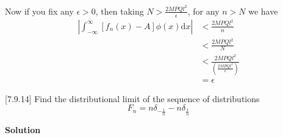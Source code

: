 \documentclass{article}
\begin{document}
%
Now if you fix any $\epsilon > 0$, then taking
$N > \frac{2 M P Q l^2}{\epsilon}$, for any $n > N$ we have
%
\begin{align*}
    \left| \int_{-\infty}^{\infty} \left[ f_n(x) - A \right] \phi(x) \mathrm{d} x \right|
        &< \frac{2 M P Q l^2}{n} \\
        &< \frac{2 M P Q l^2}{N} \\
        &< \frac{2 M P Q l^2}{\left(\frac{2 M P Q l^2}{\epsilon}\right)} \\
        &= \epsilon
\end{align*}

\vspace{5mm}

[7.9.14] Find the distributional limit of the sequence of distributions
%
\begin{equation*}
    F_n = n \delta_{- \frac{1}{n}} - n \delta_{\frac{1}{n}}
\end{equation*}

\textbf{Solution}
\end{document}
